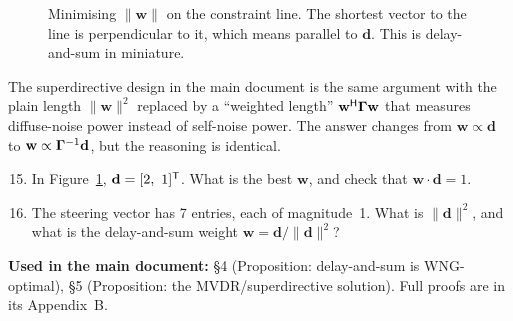 \documentclass[11pt]{article}
\begin{document}
\begin{figure}[ht]
\centering
{}
\caption{Minimising $\|\mathbf w\|$ on the constraint line. The shortest vector to the line is
perpendicular to it, which means parallel to $\mathbf d$. This is delay-and-sum in miniature.}
\label{fig:cs}
\end{figure}

The superdirective design in the main document is the same argument with the plain length
$\|\mathbf w\|^2$ replaced by a ``weighted length'' $\mathbf w^{\mathsf H}\bm{\Gamma}\mathbf w$ that measures
diffuse-noise power instead of self-noise power. The answer changes from
$\mathbf w\propto\mathbf d$ to $\mathbf w\propto\bm{\Gamma}^{-1}\mathbf d$, but the reasoning is identical.

\begin{checkyourself}
\begin{enumerate}[nosep]
\setcounter{enumi}{14}
\item In Figure~\ref{fig:cs}, $\mathbf d=[2,\ 1]\tr$. What is the best $\mathbf w$, and check that
  $\mathbf w\cdot\mathbf d=1$.
\item The steering vector has 7 entries, each of magnitude~1. What is $\|\mathbf d\|^2$, and what
  is the delay-and-sum weight $\mathbf w=\mathbf d/\|\mathbf d\|^2$?
\end{enumerate}
\end{checkyourself}

\begin{whereused}
\textbf{Used in the main document:} \S4 (Proposition: delay-and-sum is WNG-optimal), \S5
(Proposition: the MVDR/superdirective solution). Full proofs are in its Appendix~B.
\end{whereused}
\end{document}
